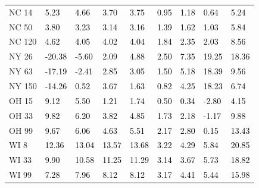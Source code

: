\begin{tabular}{lllllllll}
NC 14 & \textcolor{black}{ 5.23 } & \textcolor{black}{ 4.66 } & \textcolor{black}{ 3.70 } & \textcolor{black}{ 3.75 } & \textcolor{black}{ 0.95 } & \textcolor{black}{ 1.18 } & \textcolor{black}{ 0.64 } & \textcolor{black}{ 5.24 } \\
NC 50 & \textcolor{black}{ 3.80 } & \textcolor{black}{ 3.23 } & \textcolor{black}{ 3.14 } & \textcolor{black}{ 3.16 } & \textcolor{black}{ 1.39 } & \textcolor{black}{ 1.62 } & \textcolor{black}{ 1.03 } & \textcolor{black}{ 5.84 } \\
NC 120 & \textcolor{black}{ 4.62 } & \textcolor{black}{ 4.05 } & \textcolor{black}{ 4.02 } & \textcolor{black}{ 4.04 } & \textcolor{black}{ 1.84 } & \textcolor{black}{ 2.35 } & \textcolor{black}{ 2.03 } & \textcolor{black}{ 8.56 } \\
NY 26 & \textcolor{black}{ -20.38 } & \textcolor{black}{ -5.60 } & \textcolor{black}{ 2.09 } & \textcolor{black}{ 4.88 } & \textcolor{black}{ 2.50 } & \textcolor{black}{ 7.35 } & \textcolor{black}{ 19.25 } & \textcolor{black}{ 18.36 } \\
NY 63 & \textcolor{black}{ -17.19 } & \textcolor{black}{ -2.41 } & \textcolor{black}{ 2.85 } & \textcolor{black}{ 3.05 } & \textcolor{black}{ 1.50 } & \textcolor{black}{ 5.18 } & \textcolor{black}{ 18.39 } & \textcolor{black}{ 9.56 } \\
NY 150 & \textcolor{black}{ -14.26 } & \textcolor{black}{ 0.52 } & \textcolor{black}{ 3.67 } & \textcolor{black}{ 1.63 } & \textcolor{black}{ 0.82 } & \textcolor{black}{ 4.25 } & \textcolor{black}{ 18.23 } & \textcolor{black}{ 6.74 } \\
OH 15 & \textcolor{black}{ 9.12 } & \textcolor{black}{ 5.50 } & \textcolor{black}{ 1.21 } & \textcolor{black}{ 1.74 } & \textcolor{black}{ 0.50 } & \textcolor{black}{ 0.34 } & \textcolor{black}{ -2.80 } & \textcolor{black}{ 4.15 } \\
OH 33 & \textcolor{black}{ 9.82 } & \textcolor{black}{ 6.20 } & \textcolor{black}{ 3.82 } & \textcolor{black}{ 4.85 } & \textcolor{black}{ 1.73 } & \textcolor{black}{ 2.18 } & \textcolor{black}{ -1.17 } & \textcolor{black}{ 9.88 } \\
OH 99 & \textcolor{black}{ 9.67 } & \textcolor{black}{ 6.06 } & \textcolor{black}{ 4.63 } & \textcolor{black}{ 5.51 } & \textcolor{black}{ 2.17 } & \textcolor{black}{ 2.80 } & \textcolor{black}{ 0.15 } & \textcolor{black}{ 13.43 } \\
WI 8 & \textcolor{black}{ 12.36 } & \textcolor{black}{ 13.04 } & \textcolor{black}{ 13.57 } & \textcolor{black}{ 13.68 } & \textcolor{black}{ 3.22 } & \textcolor{black}{ 4.29 } & \textcolor{black}{ 5.84 } & \textcolor{black}{ 20.85 } \\
WI 33 & \textcolor{black}{ 9.90 } & \textcolor{black}{ 10.58 } & \textcolor{black}{ 11.25 } & \textcolor{black}{ 11.29 } & \textcolor{black}{ 3.14 } & \textcolor{black}{ 3.67 } & \textcolor{black}{ 5.73 } & \textcolor{black}{ 18.82 } \\
WI 99 & \textcolor{black}{ 7.28 } & \textcolor{black}{ 7.96 } & \textcolor{black}{ 8.12 } & \textcolor{black}{ 8.12 } & \textcolor{black}{ 3.17 } & \textcolor{black}{ 4.41 } & \textcolor{black}{ 5.44 } & \textcolor{black}{ 15.98 } \\
\bottomrule
\end{tabular}
